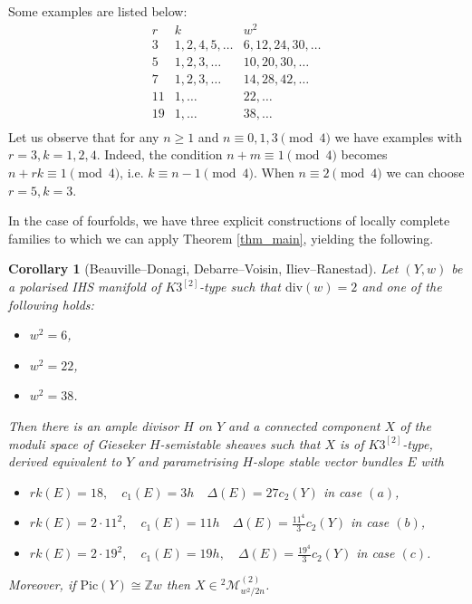 \documentclass[12pt,a4paper]{amsart}
\theoremstyle{plain}
\newtheorem{cor}[thm]{Corollary}
\theoremstyle{definition}
\theoremstyle{remark}
\def\Pic{\mathrm{Pic}}
\def\Z{\mathbb{Z}}
\newcommand{\dv}{\mathrm{div}}
\newcommand{\cc}{c}
\begin{document}
Some examples are listed below:
$$\begin{array}{cc|c}
        r&k&w^2\\
        \hline
        3&1,2,4,5,\dots&6,12,24,30,\dots\\
        5&1,2,3,\dots &10,20,30,\dots\\
        7&1,2,3,\dots&14,28,42,\dots\\
        11&1,\dots&22,\dots\\
        19&1,\dots&38,\dots\\
    \end{array}$$
Let us observe that for any 
$n\geq 1$ and $n\equiv 0,1,3\pmod{4}$ we have examples with $r=3, k=1,2,4$.
Indeed, the condition $n+m\equiv 1\pmod{4}$ becomes $n+rk\equiv 1\pmod{4}$, i.e. $k\equiv n-1 \pmod{4}$.
When $n\equiv 2\pmod{4}$ we can choose $r=5, k=3$.

In the case of fourfolds, we have three explicit constructions of locally complete families to which we can apply Theorem \ref{thm_main}, yielding the following.
\begin{cor}[Beauville--Donagi, Debarre--Voisin, Iliev--Ranestad]\label{cor_BD_DV_IR} Let $(Y,w)$ be a polarised IHS manifold  of $K3^{[2]}$-type such that $\dv(w)=2$ and one of the following holds:
\begin{itemize}
    \item [{\normalfont{(a)}}] $w^2=6$,
    \item [{\normalfont{(b)}}] $w^2=22$,
    \item [{\normalfont{(c)}}] $w^2=38$.
\end{itemize}
Then there is an ample divisor $H$ on $Y$ and a connected component $X$ of the moduli space of Gieseker $H$-semistable sheaves such that $X$ is of $K3^{[2]}$-type, derived equivalent to $Y$ and parametrising $H$-slope stable vector bundles $E$ with
\begin{itemize}
    \item [{\normalfont{(a')}}] $rk(E)=18,\quad c_1(E)=3h \quad \Delta(E)=27\cc_2(Y)$ in case $(a)$,
    \item [{\normalfont{(b')}}] $rk(E)=2\cdot11^2,\quad c_1(E)=11h\quad \Delta(E)=\frac{11^4}{3}\cc_2(Y)$ in case $(b)$,
    \item [{\normalfont{(c')}}] $rk(E)=2\cdot19^2,\quad c_1(E)=19h,\quad \Delta(E)=\frac{19^4}{3}\cc_2(Y)$ in case $(c)$.
\end{itemize}
Moreover, if $\Pic(Y)\cong \Z w$ then $X\in {}^{2}\mathcal{M}_{w^2/2n}^{(2)}$.
\end{cor}
\end{document}
